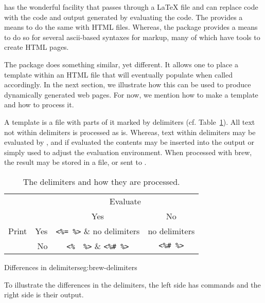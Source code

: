 \R\/ has the wonderful facility  that passes through a
\LaTeX\/ file and can replace \R\/ code with the code and output
generated by evaluating the code. The  provides a means to
do the same with HTML files. Whereas, the  package provides
a means to do so for several ascii-based syntaxes for markup, many of
which have tools to create HTML pages.

The  package does something similar, yet different. It
allows one to place a template within an HTML file that \R\/ will
eventually populate when called accordingly. In the next section, we
illustrate how this can be used to produce dynamically generated web pages. For now, we
mention how to make a template and how to process it.


A template is a file with parts of it marked by delimiters
(cf. Table~\ref{tab:brew-delimiters}). All text not within delimiters
is processed as is. Whereas, text within delimiters may be evaluated
by \R, and if evaluated the contents may be inserted into the output
or simply used to adjust the evaluation environment. When processed
with brew, the result may be stored in a file, or sent to
.


\begin{table}
  \centering
  \begin{tabular}{lr@{\quad}c@{\quad}c}
    \toprule
    &&\multicolumn{2}{c}{Evaluate}\\
    && Yes & No \\
    \cmidrule{3-4}
   Print & Yes & \verb+<%= %>+ & no delimiters\\
          & No  & \verb+<%  %>+  & \verb+<%# %>+\\
\bottomrule
 \end{tabular}
  \caption{The  delimiters and how they are processed.}
 \label{tab:brew-delimiters}
\end{table}


\begin{example}{Differences in  delimiters}{eg:brew-delimiters}

To illustrate the differences in the  delimiters, the left
side has  commands and the right side is their output.

\begin{minipage}{0.45\linewidth}
\end{minipage}
\quad\quad
\begin{minipage}{0.45\linewidth}
\end{minipage}
\end{example}

